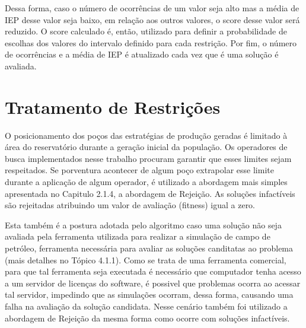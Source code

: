 Dessa forma, caso o número de ocorrências de um valor seja alto mas a média de IEP desse valor seja baixo, em relação aos outros valores, o score desse valor será reduzido. O score calculado é, então, utilizado para definir a probabilidade de escolhas dos valores do intervalo definido para cada restrição. Por fim, o número de ocorrências e a média de IEP é atualizado cada vez que é uma solução é avaliada.

\section{Tratamento de Restrições}

O posicionamento dos poços das estratégias de produção geradas é limitado à área do reservatório durante a geração inicial da população. Os operadores de busca implementados nesse trabalho procuram garantir que esses limites sejam respeitados. Se porventura acontecer de algum poço extrapolar esse limite durante a aplicação de algum operador, é utilizado a abordagem mais simples apresentada no Capitulo 2.1.4, a abordagem de Rejeição. As soluções infactíveis são rejeitadas atribuindo um valor de avaliação (fitness) igual a zero.

 
Esta também é a postura adotada pelo algoritmo caso uma solução não seja avaliada pela ferramenta utilizada para realizar a simulação de campo de petróleo, ferramenta necessária para avaliar as soluções canditatas ao problema (mais detalhes no Tópico 4.1.1). Como se trata de uma ferramenta comercial, para que tal ferramenta seja executada é necessário que computador tenha acesso a um servidor de licenças do software, é possivel que problemas ocorra ao acessar tal servidor, impedindo que as simulações ocorram, dessa forma, causando uma falha na avaliação da solução candidata. Nesse cenário também foi utilizado a abordagem de Rejeição da mesma forma como ocorre com soluções infactíveis.